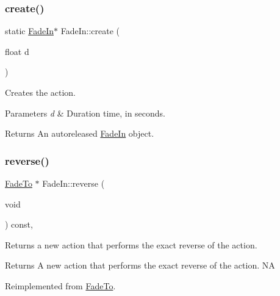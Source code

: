 \subsubsection{\texorpdfstring{create()}{create()}\hspace{0.1cm}{\footnotesize\ttfamily [2/2]}}
{\footnotesize\ttfamily static \hyperlink{classFadeIn}{Fade\+In}$\ast$ Fade\+In\+::create (\begin{DoxyParamCaption}\item[{float}]{d }\end{DoxyParamCaption})\hspace{0.3cm}{\ttfamily [static]}}

Creates the action. 
\begin{DoxyParams}{Parameters}
{\em d} & Duration time, in seconds. \\
\hline
\end{DoxyParams}
\begin{DoxyReturn}{Returns}
An autoreleased \hyperlink{classFadeIn}{Fade\+In} object. 
\end{DoxyReturn}
\mbox{\label{classFadeIn_a3c6c2fb763c9c394d37d2d699c482c3a}} 
\subsubsection{\texorpdfstring{reverse()}{reverse()}\hspace{0.1cm}{\footnotesize\ttfamily [1/2]}}
{\footnotesize\ttfamily \hyperlink{classFadeTo}{Fade\+To} $\ast$ Fade\+In\+::reverse (\begin{DoxyParamCaption}\item[{void}]{ }\end{DoxyParamCaption}) const\hspace{0.3cm}{\ttfamily [override]}, {\ttfamily [virtual]}}

Returns a new action that performs the exact reverse of the action.

\begin{DoxyReturn}{Returns}
A new action that performs the exact reverse of the action.  NA 
\end{DoxyReturn}


Reimplemented from \hyperlink{classFadeTo_a40e463b17c90aa34c3ffe0c3dc016742}{Fade\+To}.

\mbox{\label{classFadeIn_a434301deede4fbe06674250b5d7809be}} 
